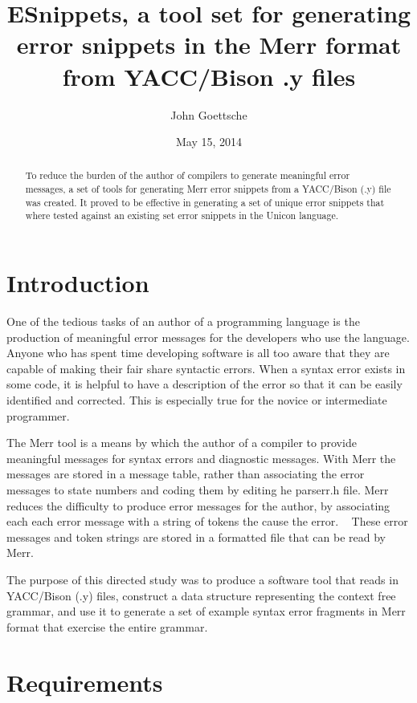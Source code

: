 \documentclass{article}
\begin{document}
\title{ESnippets, a tool set for generating error snippets in the Merr format from YACC/Bison .y files}
\author{John Goettsche}
\date{May 15, 2014}

\maketitle
\begin{abstract}
To reduce the burden of the author of compilers to generate meaningful error messages, a set of tools for generating Merr error snippets from a YACC/Bison (.y) file was created.  It proved to be effective in generating a set of unique error snippets that where tested against an existing set error snippets in the Unicon language. 
\end{abstract}

\section{Introduction}
One of the tedious tasks of an author of a programming language is the production of meaningful error messages for the developers who use the language.  Anyone who has spent time developing software is all too aware that they are capable of making their fair share syntactic errors.  When a syntax error exists in some code, it is helpful to have a description of the error so that it can be easily identified and corrected.  This is especially true for the novice or intermediate programmer.

The Merr tool is a means by which the author of a compiler to provide meaningful messages for syntax errors and diagnostic messages.  With Merr the messages are stored in a message table, rather than associating the error messages to state numbers and coding them by editing he parserr.h file.  Merr reduces the difficulty to produce error messages for the author, by associating each each error message with a string of tokens the cause the error. ~\cite{jeffery}  These error messages and token strings are stored in a formatted file that can be read by Merr. 

The purpose of this directed study was to produce a software tool that reads in YACC/Bison (.y) files, construct a data structure representing the context free grammar, and use it to generate a set of example syntax error fragments in Merr format that exercise the entire grammar.

\section{Requirements}
\end{document}
